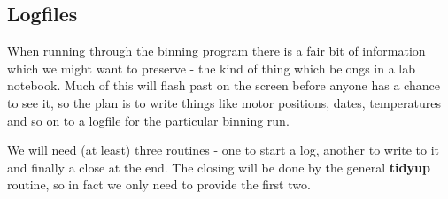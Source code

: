 \documentclass[10pt,a4paper,notitlepage]{article}
\newcommand{\code}[1]{\textbf{\textsf{#1}}} %
\begin{document}
\begin{flushleft}
\begin{minipage}{\linewidth}
\begin{list}{}{\setlength{\itemsep}{-\parsep}\setlength{\itemindent}{-\leftmargin}}
\item{}
\end{list}
\end{minipage}\vspace{4ex}
\end{flushleft}
\subsection{Logfiles}

When running through the binning program there is a fair bit of information
which we might want to preserve - the kind of thing which belongs in a 
lab notebook. 
Much of this will flash past on the screen before anyone has a chance to see
it, so the plan is to write things like motor positions, dates, temperatures
and so on to a logfile for the particular binning run. 

We will need (at least) three routines - one to start a log, another to
write to it and finally a close at the end. 
The closing will be done by the general \code{tidyup} routine, so in fact
we only need to provide the first two.
\end{document}
